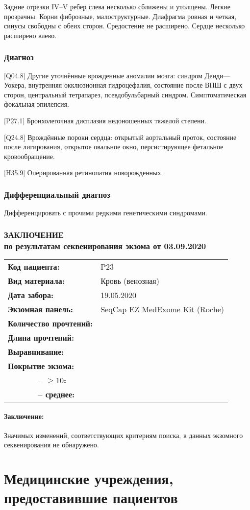 \documentclass[a4paper,14pt]{extarticle}
\newcommand{\reportgen}[9]{
\begin{tabular}{ >{\bfseries}p{0.35\textwidth} l }
Код пациента: & #1 \\
Вид материала: & #2 \\
Дата забора: & #3 \\
Экзомная панель: & #4 \\
Количество прочтений: & \numprint[\mln]{#5} \\
Длина прочтений: & \numprint[bp]{#6} \\
Выравнивание: & \numprint[\%]{#7} \\
Покрытие экзома: & ~ \\
~~~~~~ -- $\geqslant10$: & \numprint[\%]{#8} \\
~~~~~~ -- среднее: & \numprint[прочтений/позицию]{#9} \\
\end{tabular}}
\newcommand{\mln}{млн}
\newcommand{\cdate}[2]{\strong{#2 от #1:} }
\newcommand{\DS}[2]{[#2] #1}
\begin{document}
\cdate{11.09.2019}{Rg ОГК} Задние отрезки IV--V ребер слева несколько сближены и утолщены. Легкие прозрачны. Корни фиброзные, малоструктурные. Диафрагма ровная и четкая, синусы свободны с обеих сторон. Средостение не расширено. Сердце несколько расширено влево.

\subsubsection*{Диагноз}

\DS{Другие уточнённые врожденные аномалии мозга}{Q04.8}: синдром Денди---Уокера, внутренняя окклюзионная гидроцефалия, состояние после ВПШ с двух сторон, центральный тетрапарез, псевдобульбарный синдром. Симптоматическая фокальная эпилепсия.

\DS{Бронхолегочная дисплазия недоношенных тяжелой степени}{P27.1}.

\DS{Врождённые пороки сердца}{Q24.8}: открытый аортальный проток, состояние после лигирования, открытое овальное окно, персистирующее фетальное кровообращение. 

\DS{Оперированная ретинопатия новорожденных}{H35.9}.

\subsubsection*{Дифференциальный диагноз}

Дифференцировать с прочими редкими генетическими синдромами.

\newpage
\subsubsection*{ЗАКЛЮЧЕНИЕ\\по результатам секвенирования экзома от 03.09.2020}

\reportgen
{P23}
{Кровь (венозная)}{19.05.2020}
{SeqCap EZ MedExome Kit (Roche)}
{147.0}{150}{99.59}{98.74}{280}

\paragraph{Заключение:} Значимых изменений, соответствующих критериям поиска, в данных экзомного секвенирования не обнаружено.

\newpage
\section{\label{appendix:medical-institutions}Медицинские учреждения, предоставившие пациентов}
\end{document}
